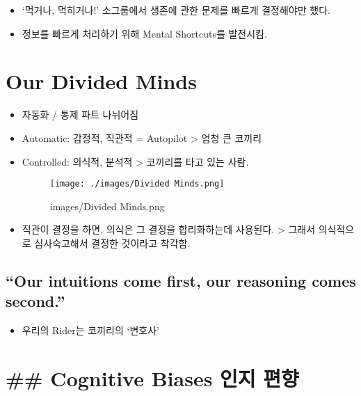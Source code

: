 \documentclass[
  letterpaper,
  DIV=11,
  numbers=noendperiod]{scrreprt}
\providecommand{\tightlist}{%
  \setlength{\itemsep}{0pt}\setlength{\parskip}{0pt}}\usepackage{longtable,booktabs,array}
\begin{document}
\begin{itemize}
\tightlist
\item
  `먹거나, 먹히거나!' 소그룹에서 생존에 관한 문제를 빠르게 결정해야만
  했다.
\item
  정보를 빠르게 처리하기 위해 Mental Shortcuts를 발전시킴.
\end{itemize}

\hypertarget{our-divided-minds}{%
\section{Our Divided Minds}\label{our-divided-minds}}

\begin{itemize}
\item
  자동화 / 통제 파트 나뉘어짐
\item
  Automatic: 감정적, 직관적 = Autopilot \textgreater{} 엄청 큰 코끼리
\item
  Controlled: 의식적, 분석적 \textgreater{} 코끼리를 타고 있는 사람.

  \begin{figure}

  {\centering \texttt{[image: ./images/Divided Minds.png]}

  }

  \caption{images/Divided Minds.png}

  \end{figure}
\item
  직관이 결정을 하면, 의식은 그 결정을 합리화하는데 사용된다.
  \textgreater{} 그래서 의식적으로 심사숙고해서 결정한 것이라고 착각함.
\end{itemize}

\hypertarget{our-intuitions-come-first-our-reasoning-comes-second.}{%
\subsection{``Our intuitions come first, our reasoning comes
second.''}\label{our-intuitions-come-first-our-reasoning-comes-second.}}

\begin{itemize}
\tightlist
\item
  우리의 Rider는 코끼리의 `변호사'
\end{itemize}

\hypertarget{cognitive-biases-uxc778uxc9c0-uxd3b8uxd5a5}{%
\section{\#\# Cognitive Biases 인지
편향}\label{cognitive-biases-uxc778uxc9c0-uxd3b8uxd5a5}}
\end{document}
